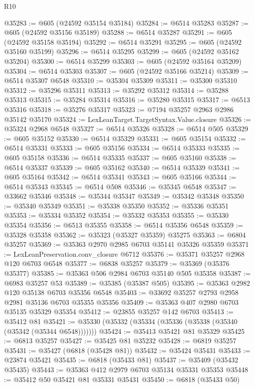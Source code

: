 \begin{lexlean}{R10}
\begin{coremodule}
@35283 := @605 (@24592 @35154 @35184)
@35284 := @6514 @35283
@35287 := @605 (@24592 @35156 @35189)
@35288 := @6514 @35287
@35291 := @605 (@24592 @35158 @35194)
@35292 := @6514 @35291
@35295 := @605 (@24592 @35160 @35199)
@35296 := @6514 @35295
@35299 := @605 (@24592 @35162 @35204)
@35300 := @6514 @35299
@35303 := @605 (@24592 @35164 @35209)
@35304 := @6514 @35303
@35307 := @605 (@24592 @35166 @35214)
@35309 := @6514 @35307 @6548
@35310 := @35304 @35309
@35311 := @35300 @35310
@35312 := @35296 @35311
@35313 := @35292 @35312
@35314 := @35288 @35313
@35315 := @35284 @35314
@35316 := @35280 @35315
@35317 := @6513 @35316
@35318 := @35276 @35317
@35323 := @7194 @35257 @2963 @2986 @35142 @35170
@35324 := LexLeanTarget.TargetSyntax.Value.closure
@35326 := @35324 @2968 @6548
@35327 := @6514 @35326
@35328 := @6514 @505
@35329 := @605 @35152
@35330 := @6514 @35329
@35331 := @605 @35154
@35332 := @6514 @35331
@35333 := @605 @35156
@35334 := @6514 @35333
@35335 := @605 @35158
@35336 := @6514 @35335
@35337 := @605 @35160
@35338 := @6514 @35337
@35339 := @605 @35162
@35340 := @6514 @35339
@35341 := @605 @35164
@35342 := @6514 @35341
@35343 := @605 @35166
@35344 := @6514 @35343
@35345 := @6514 @508
@35346 := @35345 @6548
@35347 := @33662 @35346
@35348 := @35344 @35347
@35349 := @35342 @35348
@35350 := @35340 @35349
@35351 := @35338 @35350
@35352 := @35336 @35351
@35353 := @35334 @35352
@35354 := @35332 @35353
@35355 := @35330 @35354
@35356 := @6513 @35355
@35358 := @6514 @35356 @6548
@35359 := @35328 @35358
@35362 := @35323 (@35327 @35359) @35275
@35363 := @6804 @35257
@35369 := @35363 @2970 @2985 @6703 @35141 @35326 @35359
@35371 := LexLeanPreservation.conv_closure @6712
@35376 := @35371 @35257 @2968 @120 @6703 @6548
@35377 := @6838 @35257
@35379 := @35369 (@35376 @35377)
@35385 := @35363 @506 @2984 @6703 @35140 @505 @35358
@35387 := @6983 @35257 @53
@35389 := @35385 (@35387 @505)
@35395 := @35363 @2982 @120 @35138 @6703 @35356 @6548
@35403 := @33692 @35257 @2793 @2958 @2981 @35136 @6703 @35355 @35356
@35409 := @35363 @407 @2980 @6703 @35135 @35329 @35354
@35412 := @23855 @35257 @142 @6703
@35413 := @35412 @81
@35421 := @35330 (@35332 (@35334 (@35336 (@35338 (@35340 (@35342 (@35344 @6548)))))))
@35424 := @35413 @35421 @81 @35329
@35425 := @6813 @35257
@35427 := @35425 @81 @35232
@35428 := @6819 @35257
@35431 := @35427 (@6818 (@35428 @81))
@35432 := @35424 @35431
@35433 := @23874 @35421
@35435 := @6818 (@35433 @81)
@35437 := @35409 (@35432 @35435)
@35443 := @35363 @412 @2979 @6703 @35134 @35331 @35353
@35448 := @35412 @50 @35421 @81 @35331 @35431
@35450 := @6818 (@35433 @50)

\end{coremodule}
\end{lexlean}
